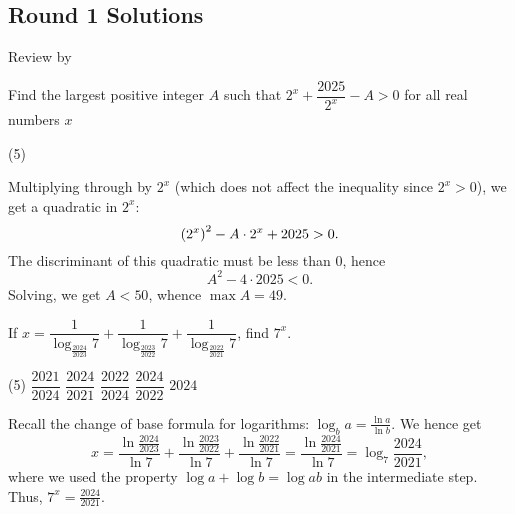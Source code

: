 \subsection{Round 1 Solutions}\label{S::2024-S-1}

\begin{resources}
    Review by 
\end{resources}

\begin{question}[D]\label{A::2024-S-1-1}
    Find the largest positive integer $A$ such that $2^x + \dfrac{2025}{2^x} - A > 0$ for all real numbers $x$

    \begin{tasks}(5)
    \end{tasks}
\end{question}
\begin{solution*}
    Multiplying through by $2^x$ (which does not affect the inequality since $2^x > 0$), we get a quadratic in $2^x$: \[\left( 2^x \right)^2 - A \cdot 2^x + 2025 > 0.\] The discriminant of this quadratic must be less than 0, hence \[A^2 - 4 \cdot 2025 < 0.\] Solving, we get $A < 50$, whence $\max A = 49$.
\end{solution*}

\begin{question}[B]\label{A::2024-S-1-2}
    If $x = \dfrac{1}{\log_{\frac{2024}{2023}} 7} + \dfrac{1}{\log_{\frac{2023}{2022}} 7} + \dfrac{1}{\log_{\frac{2022}{2021}} 7}$, find $7^x$.

    \begin{tasks}(5)
        \task $\dfrac{2021}{2024}$
        \task $\dfrac{2024}{2021}$
        \task $\dfrac{2022}{2024}$
        \task $\dfrac{2024}{2022}$
        \task $2024$
    \end{tasks}
\end{question}
\begin{solution*}
    Recall the change of base formula for logarithms: $\log_b a = \frac{\ln a}{\ln b}$. We hence get \[x = \frac{\ln \frac{2024}{2023}}{\ln 7} + \frac{\ln \frac{2023}{2022}}{\ln 7} + \frac{\ln \frac{2022}{2021}}{\ln 7} = \frac{\ln \frac{2024}{2021}}{\ln 7} = \log_7 \frac{2024}{2021},\] where we used the property $\log a + \log b = \log ab$ in the intermediate step. Thus, $7^x = \frac{2024}{2021}$.
\end{solution*}

